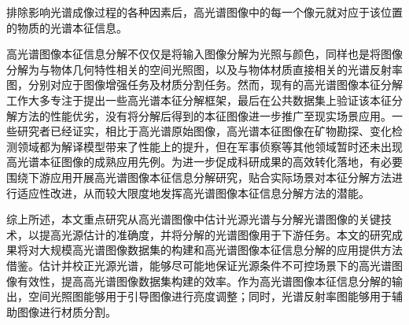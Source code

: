 \documentclass[
    type = master, %
    degree = academic,        %
    decl-page,  %
  ]{njuthesis}
\begin{document}
排除影响光谱成像过程的各种因素后，高光谱图像中的每一个像元就对应于该位置的物质的光谱本征信息。

高光谱图像本征信息分解不仅仅是将输入图像分解为光照与颜色，同样也是将图像分解为与物体几何特性相关的空间光照图，以及与物体材质直接相关的光谱反射率图，分别对应于图像增强任务及材质分割任务。然而，现有的高光谱图像本征分解工作大多专注于提出一些高光谱本征分解框架，最后在公共数据集上验证该本征分解方法的性能优劣，没有将分解后得到的本征图像进一步推广至现实场景应用\cite{李树涛2023高光谱遥感图像本征信息分解前沿与挑战}。一些研究者已经证实，相比于高光谱原始图像，高光谱本征图像在矿物勘探、变化检测领域都为解译模型带来了性能上的提升，但在军事侦察等其他领域暂时还未出现高光谱本征图像的成熟应用先例\cite{gao2021multitemporal, duan2020component}。为进一步促成科研成果的高效转化落地，有必要围绕下游应用开展高光谱图像本征信息分解研究，贴合实际场景对本征分解方法进行适应性改进，从而较大限度地发挥高光谱图像本征信息分解方法的潜能。

综上所述，本文重点研究从高光谱图像中估计光源光谱与分解光谱图像的关键技术，以提高光源估计的准确度，并将分解的光谱图像用于下游任务。本文的研究成果将对大规模高光谱图像数据集的构建和高光谱图像本征信息分解的应用提供方法借鉴。估计并校正光源光谱，能够尽可能地保证光源条件不可控场景下的高光谱图像有效性，提高高光谱图像数据集构建的效率。作为高光谱图像本征信息分解的输出，空间光照图能够用于引导图像进行亮度调整；同时，光谱反射率图能够用于辅助图像进行材质分割。


\end{document}
